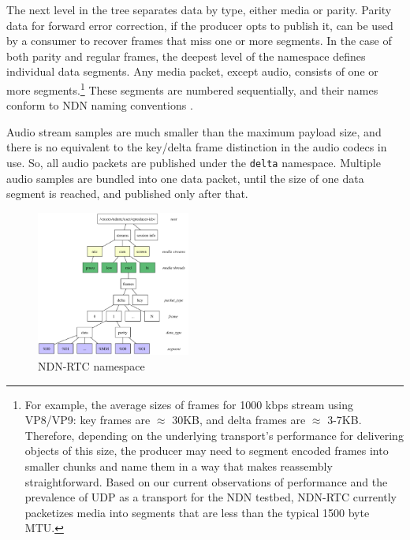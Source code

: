 \documentclass{icn/sig-alternate-2013} %
\newcommand{\ndnrtcName}{NDN-RTC} %
\begin{document}
The next level in the tree separates data by type, either media or parity. Parity data for forward error correction, if the producer opts to publish it, can be used by a consumer to recover frames that miss one or more segments. 
In the case of both parity and regular frames, the deepest level of the namespace defines individual data segments. Any media packet, except audio, consists of one or more segments.\footnote{For example, the average sizes of frames for 1000 kbps stream using VP8/VP9: key frames are $\approx$ 30KB, and delta frames are $\approx$ 3-7KB. Therefore, depending on the underlying transport's performance for delivering objects of this size, the producer may need to segment encoded frames into smaller chunks and name them in a way that makes reassembly straightforward. Based on our current observations of performance and the prevalence of UDP as a transport for the NDN testbed, \ndnrtcName{} currently packetizes media into segments that are less than the typical 1500 byte MTU.} These segments are numbered sequentially, and their names conform to NDN naming conventions \cite{ndnnaming}.

Audio stream samples are much smaller than the maximum payload size, and there is no equivalent to the key/delta frame distinction in the audio codecs in use. So, all audio packets are published under the \texttt{delta} namespace. Multiple audio samples are bundled into one data packet, until the size of one data segment is reached, and published only after that.

\begin{figure}[t!]
\centering
\includegraphics[width=0.45\textwidth]{namespace}
\caption{\ndnrtcName{} namespace}
\label{fig:namespace}
\end{figure}
\end{document}
